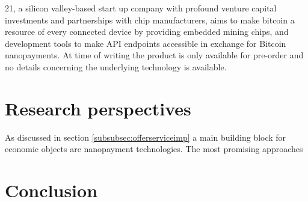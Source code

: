 \documentclass[10pt, conference,compsoc]{IEEEtran}
\begin{document}
21, a silicon valley-based start up company with profound venture capital investments and partnerships with chip manufacturers, \cite{21,21medium} aims to make bitcoin a resource of every connected device by providing embedded mining chips, and development tools to make API endpoints accessible in exchange for Bitcoin nanopayments. At time of writing the product is only available for pre-order and no details concerning the underlying technology is available. 

\section{Research perspectives}
As discussed in section \ref{subsubsec:offerserviceimp} a main building block for economic objects are nanopayment technologies. The most promising approaches  

\section{Conclusion}



%
%

\end{document}
